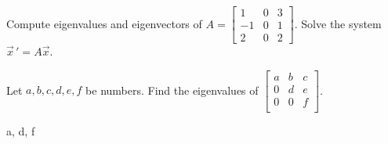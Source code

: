 \begin{exercise}\ansMark%
\leavevmode
\begin{tasks}
\task
Compute eigenvalues and eigenvectors of
$A= \left[ \begin{smallmatrix}
1 & 0 & 3 \\
-1 & 0 & 1 \\
2 & 0 & 2
\end{smallmatrix}\right]$.
\task
Solve the system
$\vec{x}\,' = A \vec{x}$.
\end{tasks}
\end{exercise}

\begin{exercise}
Let $a,b,c,d,e,f$ be numbers.  Find the eigenvalues of
$\left[ \begin{smallmatrix}
a & b & c \\
0 & d & e \\
0 & 0 & f \\
\end{smallmatrix} \right]$.
\end{exercise}
\comboSol{%
}
{%
a, d, f
}

